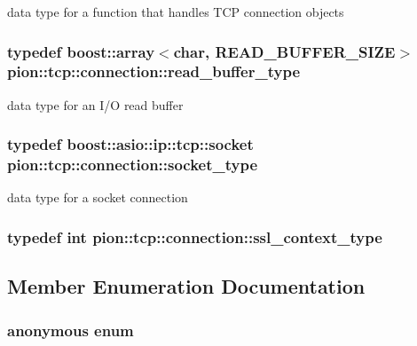 data type for a function that handles T\-C\-P connection objects 

\hypertarget{classpion_1_1tcp_1_1connection_abd482572a19c1aecadaccd360837f7c2}{
\subsubsection[{read\-\_\-buffer\-\_\-type}]{\setlength{\rightskip}{0pt plus 5cm}typedef boost\-::array$<$char, {\bf R\-E\-A\-D\-\_\-\-B\-U\-F\-F\-E\-R\-\_\-\-S\-I\-Z\-E}$>$ {\bf pion\-::tcp\-::connection\-::read\-\_\-buffer\-\_\-type}}}\label{classpion_1_1tcp_1_1connection_abd482572a19c1aecadaccd360837f7c2}


data type for an I/\-O read buffer 

\hypertarget{classpion_1_1tcp_1_1connection_a353c4d500505d51924d165c28b04641c}{
\subsubsection[{socket\-\_\-type}]{\setlength{\rightskip}{0pt plus 5cm}typedef boost\-::asio\-::ip\-::tcp\-::socket {\bf pion\-::tcp\-::connection\-::socket\-\_\-type}}}\label{classpion_1_1tcp_1_1connection_a353c4d500505d51924d165c28b04641c}


data type for a socket connection 

\hypertarget{classpion_1_1tcp_1_1connection_a8587c35bbf48a119aa82f228e779a30e}{
\subsubsection[{ssl\-\_\-context\-\_\-type}]{\setlength{\rightskip}{0pt plus 5cm}typedef int {\bf pion\-::tcp\-::connection\-::ssl\-\_\-context\-\_\-type}}}\label{classpion_1_1tcp_1_1connection_a8587c35bbf48a119aa82f228e779a30e}


\subsection{Member Enumeration Documentation}
\hypertarget{classpion_1_1tcp_1_1connection_ad123ec22701e50c2c39d4a6cdbea3e92}{\subsubsection[{anonymous enum}]{\setlength{\rightskip}{0pt plus 5cm}anonymous enum}}\label{classpion_1_1tcp_1_1connection_ad123ec22701e50c2c39d4a6cdbea3e92}


